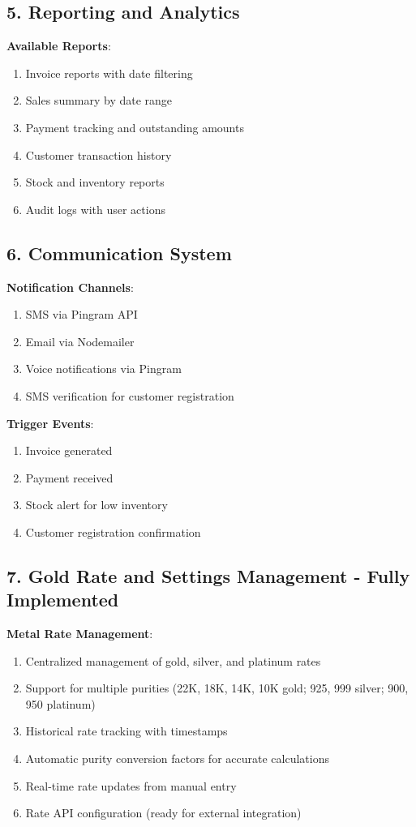 \documentclass[12pt,a4paper]{report}
\begin{document}
\subsection{5. Reporting and Analytics}

\textbf{Available Reports}:
\begin{enumerate}[label=\roman*)]
    \item Invoice reports with date filtering
    \item Sales summary by date range
    \item Payment tracking and outstanding amounts
    \item Customer transaction history
    \item Stock and inventory reports
    \item Audit logs with user actions
\end{enumerate}

\subsection{6. Communication System}

\textbf{Notification Channels}:
\begin{enumerate}[label=\roman*)]
    \item SMS via Pingram API
    \item Email via Nodemailer
    \item Voice notifications via Pingram
    \item SMS verification for customer registration
\end{enumerate}

\textbf{Trigger Events}:
\begin{enumerate}[label=\roman*)]
    \item Invoice generated
    \item Payment received
    \item Stock alert for low inventory
    \item Customer registration confirmation
\end{enumerate}

\subsection{7. Gold Rate and Settings Management - Fully Implemented}

\textbf{Metal Rate Management}:
\begin{enumerate}[label=\roman*)]
    \item Centralized management of gold, silver, and platinum rates
    \item Support for multiple purities (22K, 18K, 14K, 10K gold; 925, 999 silver; 900, 950 platinum)
    \item Historical rate tracking with timestamps
    \item Automatic purity conversion factors for accurate calculations
    \item Real-time rate updates from manual entry
    \item Rate API configuration (ready for external integration)
\end{enumerate}
\end{document}
